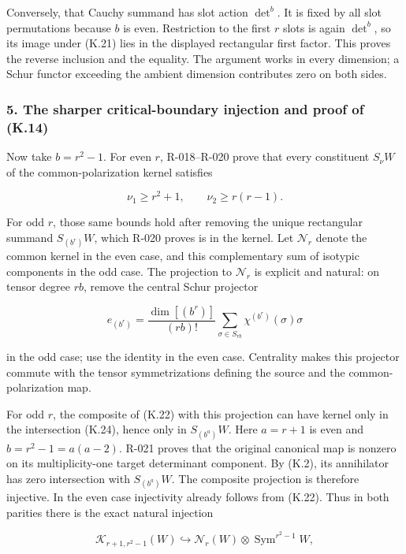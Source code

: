 \documentclass[
  10pt,
]{article}
\begin{document}
Conversely, that Cauchy summand has slot action \(\det^b\). It is fixed
by all slot permutations because \(b\) is even. Restriction to the first
\(r\) slots is again \(\det^b\), so its image under (K.21) lies in the
displayed rectangular first factor. This proves the reverse inclusion
and the equality. The argument works in every dimension; a Schur functor
exceeding the ambient dimension contributes zero on both sides.

\subsubsection{5. The sharper critical-boundary injection and proof of
(K.14)}\label{the-sharper-critical-boundary-injection-and-proof-of-k.14}

Now take \(b=r^2-1\). For even \(r\), R-018--R-020 prove that every
constituent \(S_\nu W\) of the common-polarization kernel satisfies

\[
\nu_1\ge r^2+1,\qquad \nu_2\ge r(r-1).
\tag{K.26}
\]

For odd \(r\), those same bounds hold after removing the unique
rectangular summand \(S_{(b^r)}W\), which R-020 proves is in the kernel.
Let \(\mathcal N_r\) denote the common kernel in the even case, and this
complementary sum of isotypic components in the odd case. The projection
to \(\mathcal N_r\) is explicit and natural: on tensor degree \(rb\),
remove the central Schur projector

\[
e_{(b^r)}=
\frac{\dim[(b^r)]}{(rb)!}
\sum_{\sigma\in S_{rb}}\chi^{(b^r)}(\sigma)\sigma
\tag{K.27}
\]

in the odd case; use the identity in the even case. Centrality makes
this projector commute with the tensor symmetrizations defining the
source and the common-polarization map.

For odd \(r\), the composite of (K.22) with this projection can have
kernel only in the intersection (K.24), hence only in \(S_{(b^a)}W\).
Here \(a=r+1\) is even and \(b=r^2-1=a(a-2)\). R-021 proves that the
original canonical map is nonzero on its multiplicity-one target
determinant component. By (K.2), its annihilator has zero intersection
with \(S_{(b^a)}W\). The composite projection is therefore injective. In
the even case injectivity already follows from (K.22). Thus in both
parities there is the exact natural injection

\[
\boxed{
\mathcal K_{r+1,r^2-1}(W)
\hookrightarrow\mathcal N_r(W)\otimes
\operatorname{Sym}^{r^2-1}W,}
\tag{K.28}
\]
\end{document}

